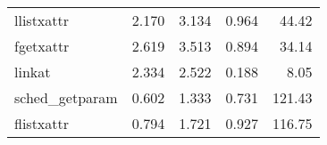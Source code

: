 \begin{tabular}{>{\ttfamily}lrrrr}
                     llistxattr &                    2.170 &                    3.134 &          0.964 &       44.42 \\
                      fgetxattr &                    2.619 &                    3.513 &          0.894 &       34.14 \\
                         linkat &                    2.334 &                    2.522 &          0.188 &        8.05 \\
                sched\_getparam &                    0.602 &                    1.333 &          0.731 &      121.43 \\
                     flistxattr &                    0.794 &                    1.721 &          0.927 &      116.75 \\
\bottomrule
\end{tabular}
